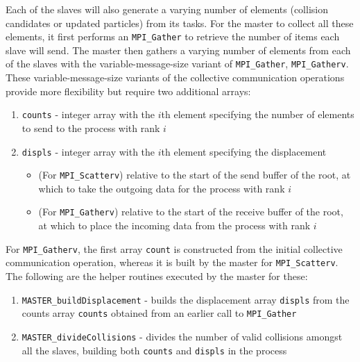 \documentclass[12pt]{article}
\begin{document}
Each of the slaves will also generate a varying number of elements (collision candidates or updated particles) from its tasks. For the master to collect all these elements, it first performs an \texttt{MPI\_Gather} to retrieve the number of items each slave will send. The master then gathers a varying number of elements from each of the slaves with the variable-message-size variant of \texttt{MPI\_Gather}, \texttt{MPI\_Gatherv}.\\

These variable-message-size variants of the collective communication operations provide more flexibility but require two additional arrays:
\begin{enumerate}
    \item \texttt{counts} - integer array with the $i$th element specifying the number of elements to send to the process with rank $i$
    \item \texttt{displs} - integer array with the $i$th element specifying the displacement
    \begin{itemize}
        \item (For \texttt{MPI\_Scatterv}) relative to the start of the send buffer of the root, at which to take the outgoing data for the process with rank $i$
        \item (For \texttt{MPI\_Gatherv}) relative to the start of the receive buffer of the root, at which to place the incoming data from the process with rank $i$
    \end{itemize}
\end{enumerate}

For \texttt{MPI\_Gatherv}, the first array \texttt{count} is constructed from the initial collective communication operation, whereas it is built by the master for \texttt{MPI\_Scatterv}. The following are the helper routines executed by the master for these:
\begin{enumerate}
    \item \texttt{MASTER\_buildDisplacement} - builds the displacement array \texttt{displs} from the counts array \texttt{counts} obtained from an earlier call to \texttt{MPI\_Gather}
    \item \texttt{MASTER\_divideCollisions} - divides the number of valid collisions amongst all the slaves, building both \texttt{counts} and \texttt{displs} in the process
\end{enumerate}
\end{document}

